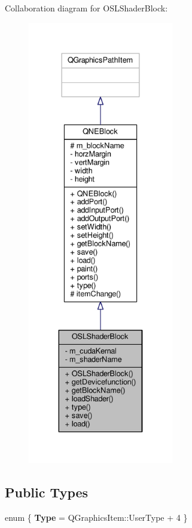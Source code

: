 Collaboration diagram for O\-S\-L\-Shader\-Block\-:
\nopagebreak
\begin{figure}[H]
\begin{center}
\leavevmode
\includegraphics[height=550pt]{class_o_s_l_shader_block__coll__graph}
\end{center}
\end{figure}
\subsection*{Public Types}
\begin{DoxyCompactItemize}
\item 
enum \{ {\bfseries Type} = Q\-Graphics\-Item\-:\-:User\-Type + 4
 \}
\end{DoxyCompactItemize}
